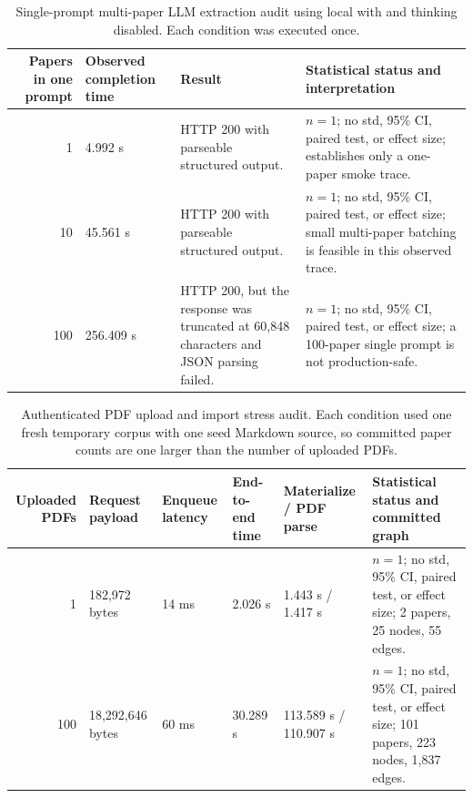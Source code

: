 \documentclass[11pt]{article}
\newcommand{\code}[1]{\texttt{\detokenize{#1}}}
\begin{document}
\begin{table}[t]
\centering
\caption{Single-prompt multi-paper LLM extraction audit using local \code{cliproxyapi} with \code{qwen3.6-plus} and thinking disabled. Each condition was executed once.}
\label{tab:local-llm-batch}
\scriptsize
\begin{tabularx}{\linewidth}{@{}r l Y Y@{}}
\toprule
Papers in one prompt & Observed completion time & Result & Statistical status and interpretation \\
 & 4.992 s & HTTP 200 with parseable structured output. & \(n=1\); no std, 95\% CI, paired test, or effect size; establishes only a one-paper smoke trace. \\
10 & 45.561 s & HTTP 200 with parseable structured output. & \(n=1\); no std, 95\% CI, paired test, or effect size; small multi-paper batching is feasible in this observed trace. \\
100 & 256.409 s & HTTP 200, but the response was truncated at 60,848 characters and JSON parsing failed. & \(n=1\); no std, 95\% CI, paired test, or effect size; a 100-paper single prompt is not production-safe. \\
\bottomrule
\end{tabularx}
\end{table}

\begin{table}[t]
\centering
\caption{Authenticated PDF upload and import stress audit. Each condition used one fresh temporary corpus with one seed Markdown source, so committed paper counts are one larger than the number of uploaded PDFs.}
\label{tab:local-upload-stress}
\scriptsize
\begin{tabularx}{\linewidth}{@{}r l l l l Y@{}}
\toprule
Uploaded PDFs & Request payload & Enqueue latency & End-to-end time & Materialize / PDF parse & Statistical status and committed graph \\
 & 182,972 bytes & 14 ms & 2.026 s & 1.443 s / 1.417 s & \(n=1\); no std, 95\% CI, paired test, or effect size; 2 papers, 25 nodes, 55 edges. \\
100 & 18,292,646 bytes & 60 ms & 30.289 s & 113.589 s / 110.907 s & \(n=1\); no std, 95\% CI, paired test, or effect size; 101 papers, 223 nodes, 1,837 edges. \\
\bottomrule
\end{tabularx}
\end{table}
\end{document}

